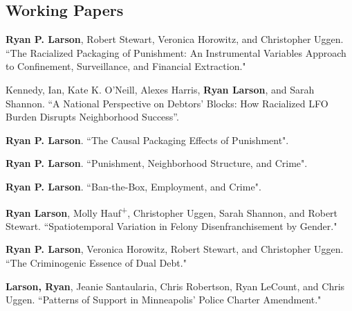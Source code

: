 \documentclass[letterpaper]{article}
\renewenvironment{itemize}{
  \begin{list}{}{
    \setlength{\leftmargin}{1.5em}
  }
}{
  \end{list}
}
\begin{document}
\subsection*{Working Papers}
\begin{itemize}

\item \textbf{Ryan P. Larson}, Robert Stewart, Veronica Horowitz, and Christopher Uggen. ``The Racialized Packaging of Punishment: An Instrumental Variables Approach to Confinement, Surveillance, and Financial Extraction." 
\item Kennedy, Ian, Kate K. O’Neill, Alexes Harris, \textbf{Ryan Larson}, and Sarah Shannon. “A National Perspective on Debtors’ Blocks: How Racialized LFO Burden Disrupts Neighborhood Success”.
\item \textbf{Ryan P. Larson}. ``The Causal Packaging Effects of Punishment".
\item \textbf{Ryan P. Larson}. ``Punishment, Neighborhood Structure, and Crime".
\item \textbf{Ryan P. Larson}. ``Ban-the-Box, Employment, and Crime".
\item \textbf{Ryan Larson}, Molly Hauf\textsuperscript{+}, Christopher Uggen, Sarah Shannon, and Robert Stewart. ``Spatiotemporal Variation in Felony Disenfranchisement by Gender."
\item \textbf{Ryan P. Larson}, Veronica Horowitz, Robert Stewart, and Christopher Uggen. ``The Criminogenic Essence of Dual Debt."
\item \textbf{Larson, Ryan}, Jeanie Santaularia, Chris Robertson, Ryan LeCount, and Chris Uggen.  ``Patterns of Support in Minneapolis’ Police Charter Amendment." 






\end{itemize}
\end{document}
